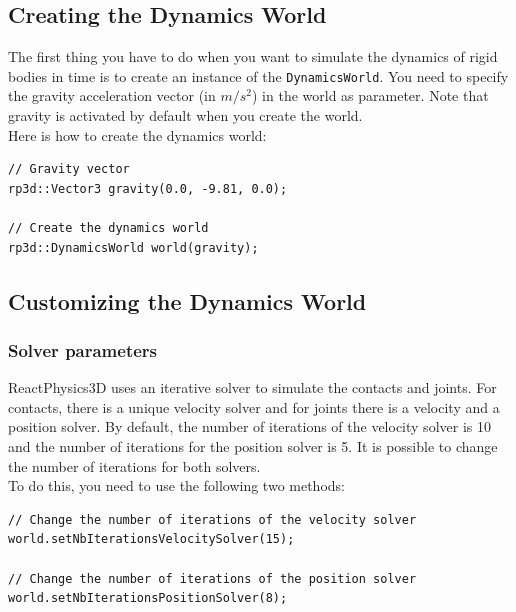 \documentclass[a4paper,12pt]{article}
\begin{document}
    \subsection{Creating the Dynamics World}

    The first thing you have to do when you want to simulate the dynamics of rigid bodies in time is to create an instance
    of the \texttt{DynamicsWorld}. You need to specify the gravity acceleration vector (in $m / s^2$) in the world as parameter. Note that gravity is
    activated by default when you create the world. \\

    Here is how to create the dynamics world: \\

    \begin{lstlisting}
// Gravity vector
rp3d::Vector3 gravity(0.0, -9.81, 0.0);

// Create the dynamics world
rp3d::DynamicsWorld world(gravity);
  \end{lstlisting}

    \subsection{Customizing the Dynamics World}

    \subsubsection{Solver parameters}

    ReactPhysics3D uses an iterative solver to simulate the contacts and joints. For contacts, there is a unique velocity solver and for joints there is a velocity and a
    position solver. By default, the number of iterations of the velocity solver is 10 and the number of iterations for the position solver is 5. It is possible to
    change the number of iterations for both solvers. \\

    To do this, you need to use the following two methods: \\

    \begin{lstlisting}
// Change the number of iterations of the velocity solver
world.setNbIterationsVelocitySolver(15);

// Change the number of iterations of the position solver
world.setNbIterationsPositionSolver(8);
  \end{lstlisting}
\end{document}
